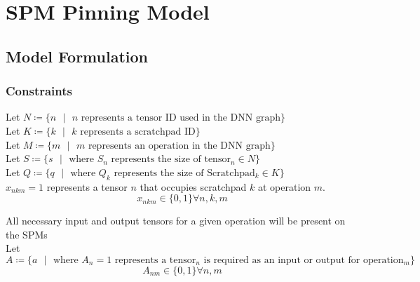 
\chapter{SPM Pinning Model} %

\label{Chapter4} %


\section{Model Formulation}


\subsection{Constraints}
Let $N \coloneqq \{ n \text{ }  | \text{ } n   \text{ represents a tensor ID used in the DNN graph}\}$\\
Let $K \coloneqq \{ k \text{ }  | \text{ } k   \text{ represents a scratchpad ID}\}$\\
Let $M \coloneqq \{ m \text{ }  | \text{ } m   \text{ represents an operation in the DNN graph}\}$\\
Let $S \coloneqq \{ s \text{ }| \text{ } \text{where } S_n \text{ represents the size of tensor$_n \in N$}\}$\\
Let $Q \coloneqq \{ q \text{ }| \text{ } \text{where } Q_k \text{ represents the size of Scratchpad$_k \in K$}\}$\\

$x_{nkm} = 1$ represents a tensor $n$ that occupies scratchpad $k$ at operation $m$.\\

\[
x_{nkm} \in \{0, 1\} \forall n,k,m
\]


All necessary input and output tensors for a given operation will be present on the SPMs\\

Let $A \coloneqq \{ a \text{ } | \text{ } \text{where } A_n = 1\text{ represents a tensor$_n$ is required as an input or output for operation$_m$} \}$\\
\[
A_{nm} \in \{0, 1\} \forall n,m
\]

